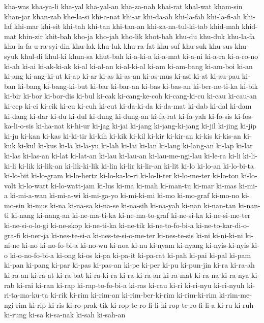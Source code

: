 {kha-was kha-ya-li kha-yal kha-yal-an kha-za-nah khai-rat khal-wat kham-sin
khan-jar khan-zab khe-la-si khi-a-nat khi-ar khi-da-ah khi-la-fah
khi-la-fi-ah khi-laf khi-mar khi-sit khi-tah khi-tan khi-tan-an
khi-za-na-tul-ki-tab khid-mah khid-mat khin-zir khit-bah kho-ja kho-jah
kho-lik khot-bah khu-du khu-duk khu-la-fa khu-la-fa-u-ra-syi-din khu-lak
khu-luk khu-ra-fat khu-suf khu-suk khu-sus khu-syuk khul-di khul-ki
khun-sa khut-bah ki-a-ki-a ki-a-mat ki-a-ni ki-a-ra ki-a-ro-no ki-ah ki-ai
ki-ak-ki-ak ki-al ki-al-an ki-al-ki-al ki-am ki-am-bang ki-am-boi ki-an
ki-ang ki-ang-ki-ut ki-ap ki-ar ki-as ki-as-an ki-as-mus ki-asi ki-at
ki-au-pau ki-ban ki-bang ki-bang-ki-but ki-bar ki-bar-an ki-bas ki-bas-an
ki-ber-ne-ti-ka ki-bik ki-bir ki-bor ki-bor-dis ki-bul ki-cak
ki-cang-ke-coh ki-cang-ki-cu ki-cau ki-cau-an ki-cep ki-ci ki-cik ki-cu
ki-cuh ki-cut ki-da-ki-da ki-da-mat ki-dab ki-dal ki-dam ki-dang ki-dar
ki-du ki-dul ki-dung ki-dung-an ki-fa-rat ki-fa-yah ki-fo-sis
ki-fos-ka-li-o-sis ki-ha-nat ki-hi-ur ki-jag ki-jai ki-jang
ki-jang-ki-jang ki-jil ki-jing ki-jip ki-ju ki-kan ki-kas ki-ki-tir ki-kih
ki-kik ki-kil ki-kir ki-kir-an ki-kis ki-kis-an ki-kuk ki-kul ki-kus ki-la
ki-la-yu ki-lah ki-lai ki-lan ki-lang ki-lang-an ki-lap ki-lar ki-las
ki-las-an ki-lat ki-lat-an ki-lau ki-lau-an ki-lau-me-ngi-lau ki-le-ra
ki-li ki-li-ki-li ki-lik ki-lik-an ki-lik-ki-lik ki-lin ki-lir ki-lir-an
ki-lit ki-lo ki-lo-an ki-lo-bi-ta ki-lo-bit ki-lo-gram ki-lo-hertz
ki-lo-ka-lo-ri ki-lo-li-ter ki-lo-me-ter ki-lo-ton ki-lo-volt ki-lo-watt
ki-lo-watt-jam ki-lus ki-ma ki-mah ki-man-tu ki-mar ki-mas ki-mi-a
ki-mi-a-wan ki-mi-a-wi ki-mi-ga-yo ki-mi-ki-mi ki-mo ki-mo-graf ki-mo-no
ki-mo-sin ki-mus ki-na ki-na-sa ki-na-se ki-na-sih ki-na-yah ki-nan
ki-nan-tan ki-nan-ti ki-nang ki-nang-an ki-ne-ma-ti-ka ki-ne-ma-to-graf
ki-ne-si-ka ki-ne-si-me-ter ki-ne-si-o-lo-gi ki-ne-skop ki-ne-ti-ka
ki-ne-tik ki-ne-to-fo-bi-a ki-ne-to-kar-di-o-gra-fi ki-ner-ja
ki-nes-te-si-a ki-nes-te-si-o-me-ter ki-nes-te-sis ki-ni ki-ni-ki-ni
ki-ni-ne ki-no ki-no-fo-bi-a ki-no-wu ki-noa ki-nu ki-nyam ki-nyang
ki-nyis-ki-nyis ki-o ki-o-no-fo-bi-a ki-ong ki-os ki-pa ki-pa-it ki-pa-rat
ki-pah ki-pai ki-pal ki-pam ki-pan ki-pang ki-par ki-pas ki-pas-an ki-pe
ki-per ki-pu ki-pun-jin ki-ra ki-ra-ah ki-ra-an ki-ra-at ki-ra-bat
ki-ra-ki-ra ki-ra-ki-ra-an ki-ra-mat ki-ra-na ki-ra-nya ki-rab ki-rai
ki-ran ki-rap ki-rap-to-fo-bi-a ki-ras ki-rau ki-ri ki-ri-nyu ki-ri-nyuh
ki-ri-ta-ma-ku-ta ki-rik ki-rim ki-rim-an ki-rim-ber-ki-rim ki-rim-ki-rim
ki-rim-me-ngi-rim ki-rip ki-ris ki-ro-prak-tik ki-rop-te-ro-fi-li
ki-rop-te-ro-fi-li-a ki-ru ki-ruh ki-rung ki-sa ki-sa-nak ki-sah ki-sah-an
}
